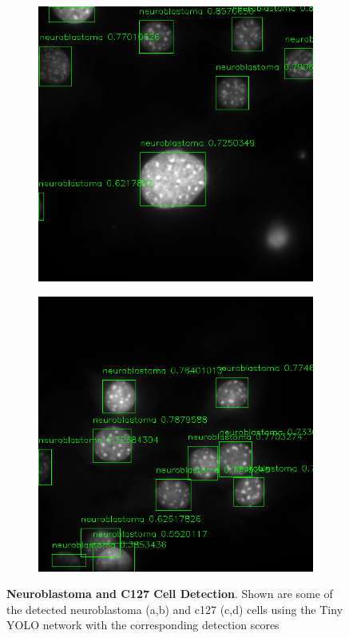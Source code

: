 \documentclass[10pt, journal, compsoc]{IEEEtran}
\begin{document}
\begin{figure}
\begin{subfigure}[b]{0.49\linewidth}
\caption{}
\end{subfigure}
\begin{subfigure}[b]{0.49\linewidth}
\includegraphics[width=\linewidth]{c127/yolo/108636.png}
\caption{}
\end{subfigure}\vspace{2pt}
\begin{subfigure}[b]{0.49\linewidth}
\includegraphics[width=\linewidth]{c127/yolo/108641.png}
\caption{}
\end{subfigure}
\caption{\textbf{Neuroblastoma and C127 Cell Detection}. Shown are some of the detected neuroblastoma (a,b) and c127 (c,d) cells using the Tiny YOLO network with the corresponding detection scores}
\label{fig:yolo_results}
\end{figure}
\end{document}
